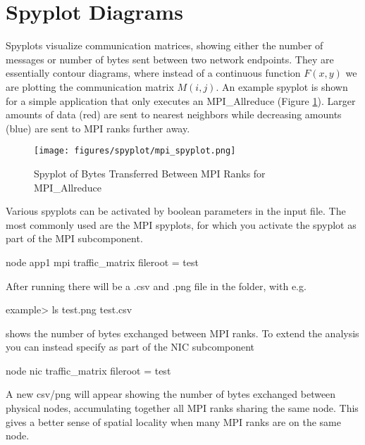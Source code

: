 

\section{Spyplot Diagrams}
\label{sec:tutorials:spyplot}

Spyplots visualize communication matrices, showing either the number of messages or number of bytes sent between two network endpoints.
They are essentially contour diagrams, where instead of a continuous function $F(x,y)$ we are plotting the communication matrix $M(i,j)$.
An example spyplot is shown for a simple application that only executes an MPI\_Allreduce (Figure \ref{fig:spyplot}).
Larger amounts of data (red) are sent to nearest neighbors while decreasing amounts (blue) are sent to MPI ranks further away.

\begin{figure}[h]
\centering
\texttt{[image: figures/spyplot/mpi\_spyplot.png]}
\caption{Spyplot of Bytes Transferred Between MPI Ranks for MPI\_Allreduce}
\label{fig:spyplot}
\end{figure}

Various spyplots can be activated by boolean parameters in the input file.
The most commonly used are the MPI spyplots, for which you activate the spyplot as part of the MPI subcomponent.

\begin{ViFile}
node {
  app1 {
    mpi {
      traffic_matrix {
        fileroot = test
      }
    }
  }
}
\end{ViFile}

After running there will be a .csv and .png file in the folder, with e.g. 

\begin{ShellCmd}
example> ls 
test.png
test.csv
\end{ShellCmd}
 shows the number of bytes exchanged between MPI ranks.
To extend the analysis you can instead specify as part of the NIC subcomponent

\begin{ViFile}
node {
  nic {
    traffic_matrix {
      fileroot = test
    }
  }
}
\end{ViFile}
A new csv/png will appear showing the number of bytes exchanged between physical nodes, 
accumulating together all MPI ranks sharing the same node.
This gives a better sense of spatial locality when many MPI ranks are on the same node.


